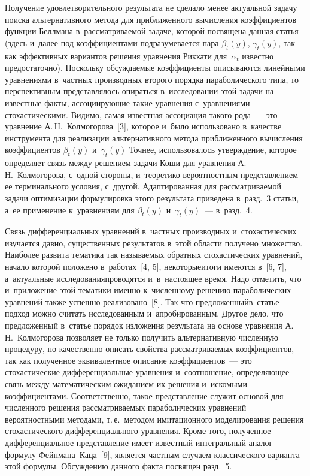 \begin{multicols}{2}
     Получение удовлетворительного результата не сделало менее 
актуальной задачу поиска альтернативного метода для приближенного 
вычисления коэффициентов функции Беллмана в~рассматриваемой задаче, 
которой посвящена данная статья  (здесь и~далее под коэффициентами 
подразумевается пара $\beta_t(y)$, $\gamma_t(y)$, так как эффективных 
вариантов решения уравнения Риккати для~$\alpha_t$ известно 
предостаточно). Поскольку обсуждаемые коэффициенты описываются 
линейными уравнениями в~частных производных второго порядка 
параболического типа, то перспективным представлялось опираться 
в~исследовании этой задачи на известные факты, ассоциирующие такие 
уравнения с~уравнениями стохастическими. Видимо, самая известная 
ассоциация такого рода~--- это уравнение А.\,Н.~Колмогорова~[3], которое 
и~было использовано в~качестве инструмента для реализации альтернативного 
метода приближенного вычисления коэффициентов $\beta_t(y)$ 
и~$\gamma_t(y)$ Точнее, использовалось утверждение, которое определяет 
связь между решением задачи Коши для уравнения А.\,Н.~Колмогорова, 
с~одной стороны, и~тео\-ре\-ти\-ко-ве\-ро\-ят\-ност\-ным представлением ее 
терминального условия, с~другой. Адап\-ти\-ро\-ван\-ная для рассматриваемой 
задачи оптимизации формулировка этого результата приведена в~разд.~3 
статьи, а~ее применение к~уравнениям для $\beta_t(y)$ и~$\gamma_t(y)$~--- 
в~разд.~4.
     
     Связь дифференциальных уравнений в~частных производных 
и~стохастических изучается давно, существенных результатов в~этой области 
получено\linebreak
 множество. Наиболее развита тематика так называемых обратных 
стохастических уравнений, нача\-ло которой положено в~работах~[4, 5], 
некоторые\linebreak итоги имеются в~[6, 7], а~актуальные исследования\linebreak проводятся 
и~в~настоящее время. Надо отметить, что и~приложение этой тематики 
именно к~численному решению параболических уравнений также успешно 
реализовано~[8]. Так что предложенный\linebreak в~статье подход можно считать 
исследованным и~апробированным. Другое дело, что предложенный в~статье 
порядок изложения результата на основе уравнения А.\,Н.~Колмогорова 
позволяет не только получить альтернативную численную процедуру, но 
качественно описать свойства рас\-смат\-ри\-ва\-емых коэффициентов, так как 
полученное эквивалентное описание коэффициентов~--- это стохастические 
дифференциальные уравнения и~соотношение, определяющее связь между 
математическим ожиданием их решения и~искомыми коэффициентами. 
Соответственно, такое представление служит основой для численного 
решения рас\-смат\-ри\-ва\-емых параболических уравнений вероятностными 
методами, т.\,е.\ методом имитационного моделирования решения 
стохастического дифференциального уравнения. Кроме того, полученное 
дифференциальное представление имеет известный интегральный аналог~--- 
формулу Фейн\-ма\-на--Ка\-ца~[9], является частным случаем классического 
варианта этой формулы. Обсуждению данного факта посвящен разд.~5. 
     

\end{multicols}
